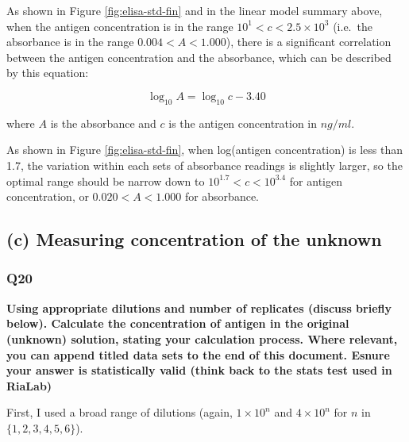 \documentclass[
]{article}
\begin{document}
As shown in Figure \ref{fig:elisa-std-fin} and in the linear model summary above, when the antigen concentration is in the range \(10^1 < c < 2.5\times10^3\) (i.e.~the absorbance is in the range \(0.004 < A < 1.000\)), there is a significant correlation between the antigen concentration and the absorbance, which can be described by this equation:

\[\log_{10}{A} = \log_{10}{c} - 3.40\]

where \(A\) is the absorbance and \(c\) is the antigen concentration in \(ng/ml\).

As shown in Figure \ref{fig:elisa-std-fin}, when log(antigen concentration) is less than 1.7, the variation within each sets of absorbance readings is slightly larger, so the optimal range should be narrow down to \(10^{1.7} < c < 10^{3.4}\) for antigen concentration, or \(0.020 < A < 1.000\) for absorbance.

\hypertarget{c-measuring-concentration-of-the-unknown}{%
\subsection*{(c) Measuring concentration of the unknown}\label{c-measuring-concentration-of-the-unknown}}

\hypertarget{q20}{%
\subsubsection*{Q20}\label{q20}}

\textbf{Using appropriate dilutions and number of replicates (discuss briefly below). Calculate the concentration of antigen in the original (unknown) solution, stating your calculation process. Where relevant, you can append titled data sets to the end of this document. Esnure your answer is statistically valid (think back to the stats test used in RiaLab)}

First, I used a broad range of dilutions (again, \(1\times10^n\) and \(4\times10^n\) for \(n\) in \(\{1,2,3,4,5,6\}\)).
\end{document}
